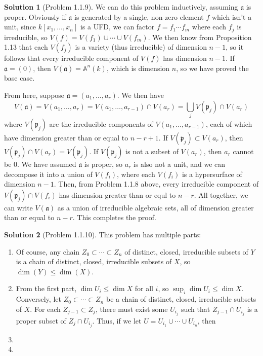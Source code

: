 \documentclass[aps,pra,showpacs,notitlepage,onecolumn,superscriptaddress,nofootinbib]{revtex4-1}
\theoremstyle{definition}
\newtheorem{solution}{Solution}[section]
\begin{document}
\begin{solution}[Problem 1.1.9]
  We can do this problem inductively, assuming $\mathfrak{a}$ is proper. Obviously if $\mathfrak{a}$ is generated by a single, non-zero element $f$ which isn't a unit, since $k[x_1, \dots, x_n]$ is a UFD, we can
  factor $f = f_1 \cdots f_m$ where each $f_j$ is irreducible, so $V(f) = V(f_1) \cup \cdots \cup V(f_m)$. We then know from Proposition 1.13 that each $V(f_j)$ is a variety (thus irreducible) of dimension $n - 1$,
  so it follows that every irreducible component of $V(f)$ has dimension $n - 1$. If $\mathfrak{a} = (0)$, then $V(\mathfrak{a}) = \mathbb{A}^n(k)$, which is dimension $n$, so we have proved the base case.

  From here, suppose $\mathfrak{a} = (a_1, \dots, a_r)$. We then have
  \begin{equation}
    V(\mathfrak{a}) = V(a_1, \dots, a_r) = V(a_1, \dots, a_{r - 1}) \cap V(a_r) = \bigcup_{j} V(\mathfrak{p}_j) \cap V(a_r)
    \end{equation}
  where $V(\mathfrak{p}_j)$ are the irreducible components of $V(a_1, \dots, a_{r - 1})$, each of which have dimension greater than or equal to $n - r + 1$. If $V(\mathfrak{p}_j) \subset V(a_r)$, then
  $V(\mathfrak{p}_j) \cap V(a_r) = V(\mathfrak{p}_j)$. If $V(\mathfrak{p}_j)$ is not a subset of $V(a_r)$, then $a_r$ cannot be $0$. We have assumed $\mathfrak{a}$ is proper, so $a_r$ is also not a unit, and
  we can decompose it into a union of $V(f_i)$, where each $V(f_i)$ is a hypersurface of dimension $n - 1$. Then, from Problem 1.1.8 above, every irreducible component of $V(\mathfrak{p}_j) \cap V(f_i)$ has dimension
  greater than or equl to $n - r$. All together, we can write $V(\mathfrak{a})$ as a union of irreducible algebraic sets, all of dimension greater than or equal to $n - r$. This completes the proof.
  \end{solution}

\begin{solution}[Problem 1.1.10]
  This problem has multiple parts:
  \begin{enumerate}
    \item Of course, any chain $Z_0 \subset \cdots \subset Z_n$ of distinct, closed, irreducible subsets of $Y$ is a chain of distinct, closed, irreducible subsets of $X$, so $\dim(Y) \leq \dim(X)$.
    \item From the first part, $\dim U_i \leq \dim X$ for all $i$, so $\sup_i \dim U_i \leq \dim X$. Conversely, let $Z_0 \subset \cdots \subset Z_n$ be a chain of distinct, closed, irreducible subsets of $X$.
     For each $Z_{j - 1} \subset Z_{j}$, there must exist some $U_{i_j}$ such that $Z_{j - 1} \cap U_{i_j}$ is a proper subset of $Z_{j} \cap U_{i_j}$. Thus, if we let $U = U_{i_1} \cup \cdots \cup U_{i_n}$, then
     \item
     \item 
    \end{enumerate}
  \end{solution}
\end{document}
